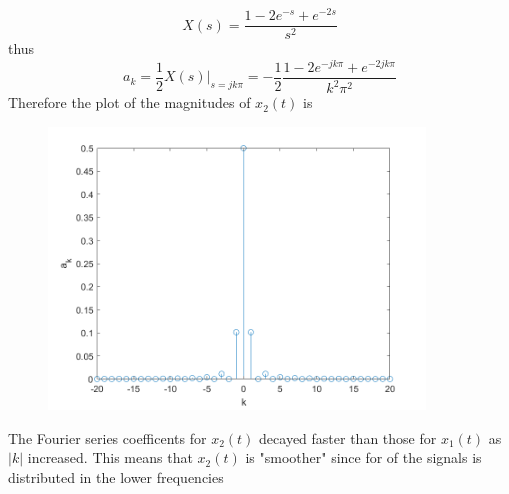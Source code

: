 \documentclass[12pt]{article}
\begin{document}
$$X(s)=\frac{1-2e^{-s}+e^{-2s}}{s^2}$$
thus
$$a_k=\frac{1}{2}\left.X(s)\right|_{s=jk\pi}=-\frac{1}{2}\frac{1-2e^{-jk\pi}+e^{-2jk\pi}}{k^2\pi^2}$$
Therefore the plot of the magnitudes of $x_2(t)$ is
\begin{center}
\begin{figure}[h]\includegraphics[width=10cm]{fig3}
\end{figure}
\end{center}
\pagebreak
The Fourier series coefficents for $x_2(t)$ decayed faster than those for $x_1(t)$ as $|k|$ increased. This means that $x_2(t)$ is "smoother" since for of the signals is distributed in the lower frequencies
\end{document}
